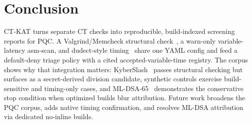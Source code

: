 \section{Conclusion}
\label{sec:conclusion}

CT-KAT turns separate CT checks into reproducible, build-indexed screening
reports for PQC. A Valgrind/Memcheck structural check~\cite{valgrind,ctgrind}, a
warn-only variable-latency asm-scan, and dudect-style timing~\cite{dudect} share
one YAML config and feed a default-deny triage policy with a cited
accepted-variable-time registry. The corpus shows why that integration matters:
KyberSlash~\cite{kyberslash} passes structural checking but surfaces as a
secret-derived division candidate, synthetic controls exercise build-sensitive
and timing-only cases, and ML-DSA-65~\cite{fips204} demonstrates the conservative
stop condition when optimized builds blur attribution. Future work broadens the
PQC corpus, adds native timing confirmation, and resolves ML-DSA attribution via
dedicated no-inline builds.

